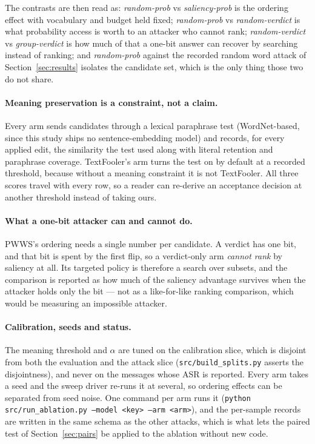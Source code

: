 The contrasts are then read as: \emph{random-prob} vs \emph{saliency-prob} is the
ordering effect with vocabulary and budget held fixed; \emph{random-prob} vs
\emph{random-verdict} is what probability access is worth to an attacker who
cannot rank; \emph{random-verdict} vs \emph{group-verdict} is how much of that a
one-bit answer can recover by searching instead of ranking; and
\emph{random-prob} against the recorded random word attack of Section~\ref{sec:results}
isolates the candidate set, which is the only thing those two do not share.

\paragraph{Meaning preservation is a constraint, not a claim.} Every arm sends
candidates through a lexical paraphrase test (WordNet-based, since this study
ships no sentence-embedding model) and records, for every applied edit, the
similarity the test used along with literal retention and paraphrase coverage.
TextFooler's arm turns the test on by default at a recorded threshold, because
without a meaning constraint it is not TextFooler. All three scores travel with
every row, so a reader can re-derive an acceptance decision at another threshold
instead of taking ours.

\paragraph{What a one-bit attacker can and cannot do.} PWWS's ordering needs a
single number per candidate. A verdict has one bit, and that bit is spent by the
first flip, so a verdict-only arm \emph{cannot rank} by saliency at all. Its
targeted policy is therefore a search over subsets, and the comparison is
reported as how much of the saliency advantage survives when the attacker holds
only the bit --- not as a like-for-like ranking comparison, which would be
measuring an impossible attacker.

\paragraph{Calibration, seeds and status.} The meaning threshold and $\alpha$ are
tuned on the calibration slice, which is disjoint from both the evaluation and the
attack slice (\texttt{src/build\_splits.py} asserts the disjointness), and never on
the messages whose ASR is reported. Every arm takes a seed and the sweep driver
re-runs it at several, so ordering effects can be separated from seed noise. One
command per arm runs it (\texttt{python src/run\_ablation.py --model <key> --arm
<arm>}), and the per-sample records are written in the same schema as the other
attacks, which is what lets the paired test of Section~\ref{sec:pairs} be applied to the
ablation without new code.


